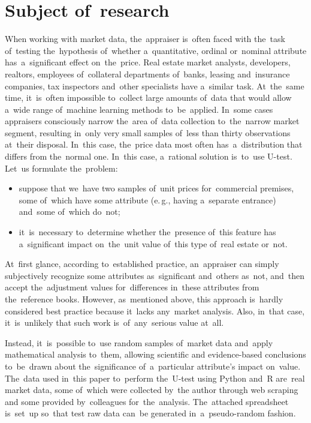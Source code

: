 \documentclass[]{scrreprt}
\begin{document}
\chapter{Subject of~research}
When working with market data, the~appraiser is~often faced with the~task of~testing the~hypothesis of~whether a~quantitative, ordinal or~nominal attribute has~a~significant effect on~the~price. Real estate market analysts, developers, realtors, employees of~collateral departments of~banks, leasing and~insurance companies, tax inspectors and~other specialists have a~similar task. At~the~same time, it~is~often impossible to~collect large amounts of~data that would allow a~wide range of~machine learning methods to~be~applied. In~some cases appraisers consciously narrow the~area of~data collection to~the~narrow market segment, resulting in~only very small samples of~less than thirty observations at~their disposal. In~this case, the~price data most often has~a~distribution that differs from the~normal one. In~this case, a~rational solution is~to~use U-test. Let~us formulate the~problem:
\begin{itemize}
	\item suppose that we~have two samples of~unit prices for~commercial premises, some of~which have some attribute (e.\,g., having a~separate entrance) and~some of~which do~not;
	\item it~is~necessary to~determine whether the~presence of~this feature has a~significant impact on~the~unit value of~this type of~real estate or~not.
\end{itemize}
At~first glance, according to~established practice, an~appraiser can simply subjectively recognize some attributes as~significant and~others as~not, and~then accept the~adjustment values for~differences in~these attributes from the~reference books. However, as~mentioned above, this approach is~hardly considered best practice because it~lacks any~market analysis. Also, in~that case, it~is~unlikely that such work is~of~any~serious value at~all.

Instead, it~is~possible to~use random samples of~market data and~apply mathematical analysis to~them, allowing scientific and evidence-based conclusions to~be~drawn about the~significance of~a~particular attribute's impact on~value. The~data used in~this paper to~perform the~U-test using Python and~R are~real market data, some of~which were collected by~the author through web scraping and some provided by~colleagues for~the~analysis. The~attached spreadsheet is~set~up so~that test raw data can~be generated in~a~pseudo-random fashion.
\end{document}
